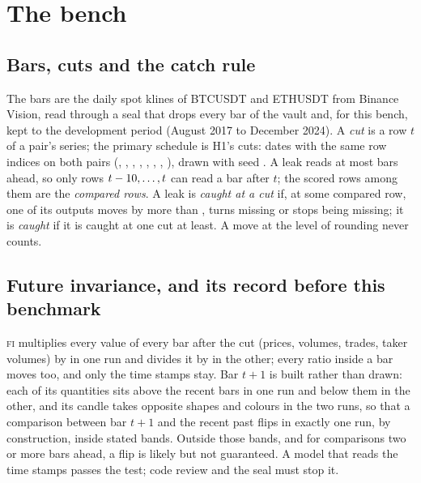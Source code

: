 \documentclass[11pt]{article}
\newcommand{\FI}{\textsc{fi}}
\begin{document}
\section{The bench}\label{sec:bench}

\subsection{Bars, cuts and the catch rule}\label{sec:bars}
The bars are the daily spot klines of BTCUSDT and ETHUSDT from Binance Vision, read through a seal
that drops every bar of the vault and, for this bench, kept to the development period (August 2017
to December 2024). A \emph{cut} is a row $t$ of a pair's series; the primary schedule is H1's
\NumHoneCutsN{} cuts: \NumCutDates{} dates with the same row indices on both pairs
(\NumCutRowA, \NumCutRowB, \NumCutRowC, \NumCutRowD, \NumCutRowE, \NumCutRowF, \NumCutRowG,
\NumCutRowH), drawn with seed \NumCutSeed. A leak reads at most \NumReach{} bars ahead, so only
rows $t-10,\dots,t$ can read a bar after $t$; the scored rows among them are the
\emph{compared rows}. A leak is \emph{caught at a cut} if, at some compared row, one of its
outputs moves by more than \NumCatchThreshold, turns missing or stops being missing; it is
\emph{caught} if it is caught at one cut at least. A move at the level of rounding never counts.

\subsection{Future invariance, and its record before this benchmark}\label{sec:fi}
\FI{} multiplies every value of every bar after the cut (prices, volumes, trades, taker volumes)
by \NumFIup{} in one run and divides it by \NumFIdown{} in the other; every ratio inside a bar
moves too, and only the time stamps stay. Bar $t+1$ is built rather than drawn: each of its
quantities sits above the recent bars in one run and below them in the other, and its candle takes
opposite shapes and colours in the two runs, so that a comparison between bar $t+1$ and the recent
past flips in exactly one run, by construction, inside stated bands. Outside those bands, and for
comparisons two or more bars ahead, a flip is likely but not guaranteed. A model that reads the time
stamps passes the test; code review and the seal must stop it.
\end{document}
